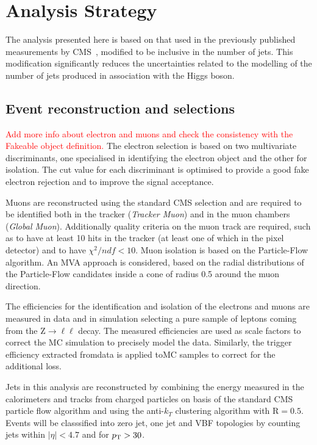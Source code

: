 \section{Analysis Strategy}
\label{sec:AnalysisStrategy}

The analysis presented here is based on that used in the previously published \hwwllnn{}
measurements by CMS~\cite{Chatrchyan:2013iaa}, modified to be inclusive in the number of jets. 
This modification significantly reduces the uncertainties related to the modelling of the number of jets produced in association with the Higgs boson.


\subsection{Event reconstruction and selections}\label{sec:Selections}

\textcolor{red}{Add more info about electron and muons and check the consistency with the Fakeable object definition.}
The electron selection is based on two multivariate discriminants, one specialised in identifying the electron object and the other for isolation. The cut value for each discriminant is optimised to provide a good fake electron rejection and to improve the signal acceptance.

Muons are reconstructed using the standard CMS selection and are required to be identified both in the tracker (\textit{Tracker Muon}) and in the muon chambers (\textit{Global Muon}). Additionally quality criteria on the muon track are required, such as to have at least 10 hits in the tracker (at least one of which in the pixel detector) and to have $\chi^2/ndf < 10$.
Muon isolation is based on the Particle-Flow algorithm. An MVA approach is considered, based on the radial distributions of the Particle-Flow candidates inside a cone of radius 0.5 around the muon direction.

The efficiencies for the identification and isolation of the electrons and muons are measured in data and in simulation selecting a pure sample of leptons coming from the Z$\to\ell\ell$ decay. The measured efficiencies are used as scale factors to correct the MC simulation to precisely model the data. Similarly, the trigger efficiency extracted fromdata is applied toMC samples to correct for the additional loss.

Jets in this analysis are reconstructed by combining the energy measured in the calorimeters and tracks from charged particles on basis of the standard CMS particle flow algorithm and using the anti-$k_T$ clustering algorithm with $\mathrm{R} = 0.5$. Events will be classsified into zero jet, one jet and VBF topologies by counting jets within $|\eta| < 4.7$ and for $p_\mathrm{T} > 30$\GeV.

